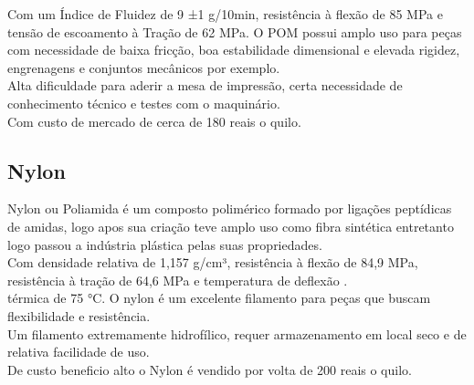 Com um Índice de Fluidez de 9 ±1 g/10min, resistência à flexão de 85 MPa e tensão de escoamento à Tração de 62 MPa. O POM possui amplo uso para peças com necessidade de baixa fricção, boa estabilidade dimensional e elevada rigidez, engrenagens e conjuntos mecânicos por exemplo. \\[0.2cm]



Alta dificuldade para aderir a mesa de impressão, certa necessidade de conhecimento técnico e testes com o maquinário.\\[0.2cm]



Com custo de mercado de cerca de 180 reais o quilo. \\[0.2cm]



\subsection{Nylon}



Nylon ou Poliamida é um composto polimérico formado por ligações peptídicas de amidas, logo apos sua criação teve amplo uso como fibra sintética entretanto logo passou a indústria plástica pelas suas propriedades. \\[0.2cm]



Com densidade relativa de 1,157 g/cm³, resistência à flexão de 84,9 MPa, resistência à tração de 64,6 MPa e temperatura de deflexão .\\[0.2cm]

térmica de 75 °C. O nylon é um excelente filamento para peças que buscam flexibilidade e resistência. \\[0.2cm]



Um filamento extremamente hidrofílico, requer armazenamento em local seco e de relativa facilidade de uso.\\[0.2cm]



De custo beneficio alto o Nylon é vendido por volta de 200 reais o quilo. \\[0.2cm]






